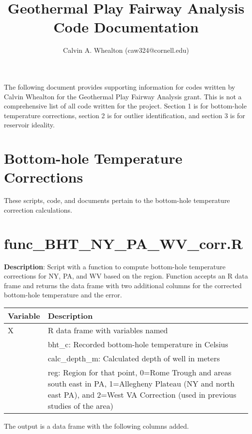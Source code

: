 \documentclass[12pt,a4paper]{article}
\author{Calvin A. Whealton (caw324@cornell.edu)}
\title{Geothermal Play Fairway Analysis Code Documentation}
\begin{document}
\maketitle
The following document provides supporting information for codes written by Calvin Whealton for the Geothermal Play Fairway Analysis grant. This is not a comprehensive list of all code written for the project. Section 1 is for bottom-hole temperature corrections, section 2 is for outlier identification, and section 3 is for reservoir ideality. 

\section*{Bottom-hole Temperature Corrections}

These scripts, code, and documents pertain to the bottom-hole temperature correction calculations.

\section*{\textsf{func\_BHT\_NY\_PA\_WV\_corr.R}}

\textbf{Description}: Script with a function to compute bottom-hole temperature corrections for NY, PA, and WV based on the region. Function accepts an R data frame and returns the data frame with two additional columns for the corrected bottom-hole temperature and the error.

\begin{table}[H]
\begin{tabular} {p{2cm} p{11cm}}
\hline
\textbf{Variable} & \textbf{Description}\\
\hline
\textsf{X} 			 & R data frame with variables named\\
 & \textsf{bht\_c}: Recorded bottom-hole temperature in Celsius\\
 & \textsf{calc\_depth\_m}: Calculated depth of well in meters\\
 & \textsf{reg}:  Region for that point, 0=Rome Trough and areas south east in PA, 1=Allegheny Plateau (NY and north east PA), and 2=West VA Correction (used in previous studies of the area)\\
\hline
\end{tabular} 
\end{table}

The output is a data frame with the following columns added.
\end{document}
